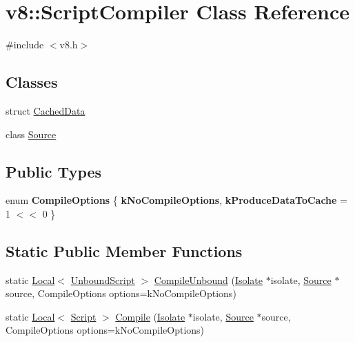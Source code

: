 \hypertarget{classv8_1_1_script_compiler}{}\section{v8\+:\+:Script\+Compiler Class Reference}
\label{classv8_1_1_script_compiler}


{\ttfamily \#include $<$v8.\+h$>$}

\subsection*{Classes}
\begin{DoxyCompactItemize}
\item 
struct \hyperlink{structv8_1_1_script_compiler_1_1_cached_data}{Cached\+Data}
\item 
class \hyperlink{classv8_1_1_script_compiler_1_1_source}{Source}
\end{DoxyCompactItemize}
\subsection*{Public Types}
\begin{DoxyCompactItemize}
\item 
\hypertarget{classv8_1_1_script_compiler_aa6db7774ab5d8793cd88db6b35a71818}{}enum {\bfseries Compile\+Options} \{ {\bfseries k\+No\+Compile\+Options}, 
{\bfseries k\+Produce\+Data\+To\+Cache} = 1 $<$$<$ 0
 \}\label{classv8_1_1_script_compiler_aa6db7774ab5d8793cd88db6b35a71818}

\end{DoxyCompactItemize}
\subsection*{Static Public Member Functions}
\begin{DoxyCompactItemize}
\item 
static \hyperlink{classv8_1_1_local}{Local}$<$ \hyperlink{classv8_1_1_unbound_script}{Unbound\+Script} $>$ \hyperlink{classv8_1_1_script_compiler_a5f590f94e2705d12392c17b7fa097e1d}{Compile\+Unbound} (\hyperlink{classv8_1_1_isolate}{Isolate} $\ast$isolate, \hyperlink{classv8_1_1_script_compiler_1_1_source}{Source} $\ast$source, Compile\+Options options=k\+No\+Compile\+Options)
\item 
static \hyperlink{classv8_1_1_local}{Local}$<$ \hyperlink{classv8_1_1_script}{Script} $>$ \hyperlink{classv8_1_1_script_compiler_a4cef8b34c2744f6508a9ce53182c19bf}{Compile} (\hyperlink{classv8_1_1_isolate}{Isolate} $\ast$isolate, \hyperlink{classv8_1_1_script_compiler_1_1_source}{Source} $\ast$source, Compile\+Options options=k\+No\+Compile\+Options)
\end{DoxyCompactItemize}


